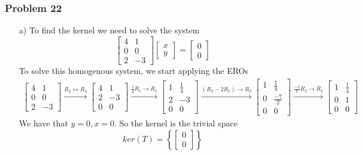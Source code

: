 \documentclass[a4paper,12pt]{article}
\begin{document}
\subsubsection*{Problem 22}
\begin{itemize}
    \item [a)] To find the kernel we need to solve the system 
\[
\begin{bmatrix}
    4&1\\
    0&0\\
    2&-3
\end{bmatrix} \begin{bmatrix}
    x\\
    y
\end{bmatrix}=\begin{bmatrix}
    0\\
    0
\end{bmatrix}
\]
To solve this homogenous system, we start applying the EROs
\begin{align*}
    \begin{bmatrix}
    4&1\\
    0&0\\
    2&-3
\end{bmatrix}\xrightarrow{{R_2}\leftrightarrow{R_3}}
\begin{bmatrix}
    4&1\\
    2&-3\\
    0&0
\end{bmatrix} \xrightarrow{{\frac{1}{4}R_1}\to{R_1}}
\begin{bmatrix}
    1&\frac{1}{4}\\
    2&-3\\
    0&0
\end{bmatrix} \xrightarrow{{(R_2-2R_1)}\to{R_2}}
\begin{bmatrix}
    1&\frac{1}{4}\\
    0&\frac{-7}{2}\\
    0&0
\end{bmatrix} \xrightarrow{{\frac{-2}{7}R_2}\to{R_2}}
\begin{bmatrix}
    1&\frac{1}{4}\\
    0&1\\
    0&0
\end{bmatrix}
\end{align*}
We have that $y=0, x=0.$ So the kernel is the trivial space 
\[ker(T)=\left\{\begin{bmatrix}
0\\
0
\end{bmatrix}\right\}\]

\end{itemize}
\end{document}
